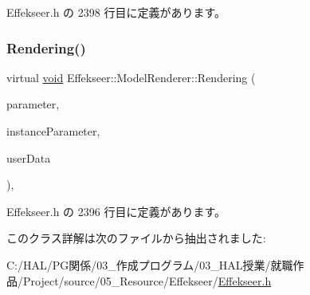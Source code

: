  Effekseer.\+h の 2398 行目に定義があります。

\mbox{\label{class_effekseer_1_1_model_renderer_af83aa3f24f7dc3e7681579f07d0f9086}} 
\subsubsection{\texorpdfstring{Rendering()}{Rendering()}}
{\footnotesize\ttfamily virtual \mbox{\hyperlink{namespace_effekseer_ab34c4088e512200cf4c2716f168deb56}{void}} Effekseer\+::\+Model\+Renderer\+::\+Rendering (\begin{DoxyParamCaption}\item[{const \mbox{\hyperlink{struct_effekseer_1_1_model_renderer_1_1_node_parameter}{Node\+Parameter}} \&}]{parameter,  }\item[{const \mbox{\hyperlink{struct_effekseer_1_1_model_renderer_1_1_instance_parameter}{Instance\+Parameter}} \&}]{instance\+Parameter,  }\item[{\mbox{\hyperlink{namespace_effekseer_ab34c4088e512200cf4c2716f168deb56}{void}} $\ast$}]{user\+Data }\end{DoxyParamCaption})\hspace{0.3cm}{\ttfamily [inline]}, {\ttfamily [virtual]}}



 Effekseer.\+h の 2396 行目に定義があります。



このクラス詳解は次のファイルから抽出されました\+:\begin{DoxyCompactItemize}
\item 
C\+:/\+H\+A\+L/\+P\+G関係/03\+\_\+作成プログラム/03\+\_\+\+H\+A\+L授業/就職作品/\+Project/source/05\+\_\+\+Resource/\+Effekseer/\mbox{\hyperlink{_effekseer_8h}{Effekseer.\+h}}\end{DoxyCompactItemize}
